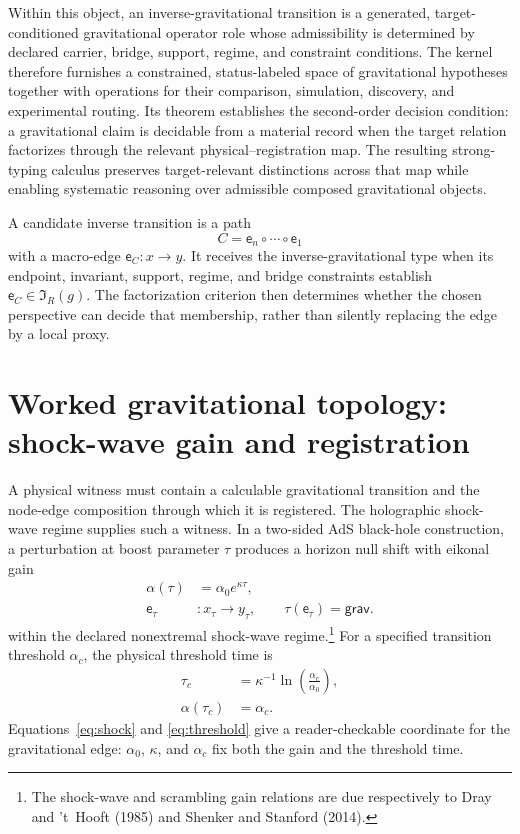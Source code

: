 \documentclass[10pt,twoside,a5paper]{article}
\newcommand{\Inv}{\ensuremath{\mathfrak I}}
\newcommand{\Grav}{\ensuremath{\mathsf{grav}}}
\newcommand{\Edge}{\ensuremath{\mathsf e}}
\theoremstyle{definition}
\begin{document}
Within this object, an inverse-gravitational transition is a generated,
target-conditioned gravitational operator role whose admissibility is determined by
declared carrier, bridge, support, regime, and constraint conditions. The kernel
therefore furnishes a constrained, status-labeled space of gravitational hypotheses
together with operations for their comparison, simulation, discovery, and experimental
routing. Its theorem establishes the second-order decision condition: a gravitational
claim is decidable from a material record when the target relation factorizes through
the relevant physical--registration map. The resulting strong-typing calculus
preserves target-relevant distinctions across that map while enabling systematic
reasoning over admissible composed gravitational objects.

A candidate inverse transition is a path
\begin{equation}
C=\Edge_n\circ\cdots\circ\Edge_1
\label{eq:gravity-composition}
\end{equation}
with a macro-edge $\Edge_C:x\to y$. It receives the inverse-gravitational type when
its endpoint, invariant, support, regime, and bridge constraints establish
$\Edge_C\in\Inv_R(g)$. The factorization criterion then determines whether the
chosen perspective can decide that membership, rather than silently replacing the
edge by a local proxy.

\section{Worked gravitational topology: shock-wave gain and registration}
\label{sec:worked}

A physical witness must contain a calculable gravitational transition and the
node-edge composition through which it is registered. The holographic shock-wave
regime supplies such a witness. In a two-sided AdS black-hole construction, a
perturbation at boost parameter $\tau$ produces a horizon null shift with eikonal
gain
\begin{equation}
\begin{aligned}
\alpha(\tau)&=\alpha_0e^{\kappa\tau},\\
\Edge_\tau&:x_\tau\longrightarrow y_\tau,
\qquad \tau(\Edge_\tau)=\Grav.
\end{aligned}
\label{eq:shock}
\end{equation}
within the declared nonextremal shock-wave regime.\footnote{The shock-wave
and scrambling gain relations are due respectively to Dray and 't~Hooft (1985)
and Shenker and Stanford (2014).} For a specified transition threshold $\alpha_c$,
the physical threshold time is
\begin{equation}
\begin{aligned}
\tau_c&=\kappa^{-1}\ln\!\left(\frac{\alpha_c}{\alpha_0}\right),\\
\alpha(\tau_c)&=\alpha_c.
\end{aligned}
\label{eq:threshold}
\end{equation}
Equations~\eqref{eq:shock} and \eqref{eq:threshold} give a reader-checkable
coordinate for the gravitational edge: $\alpha_0$, $\kappa$, and $\alpha_c$ fix
both the gain and the threshold time.
\end{document}
